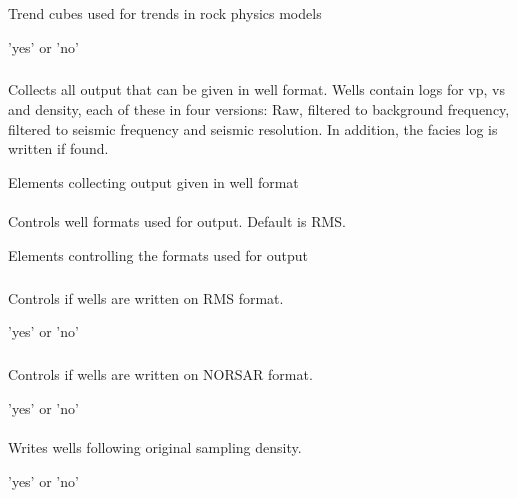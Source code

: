\subparagraph{}
 \slist
   \item \Description Trend cubes used for trends in rock physics models
   \item \Argument 'yes' or 'no'
   \item \Default
\elist

\subsubsection{}
 \slist
   \item \Description Collects all output that can be given in well format. Wells contain logs for vp, vs and density, each of these in four versions: Raw, filtered to background frequency, filtered to seismic frequency and seismic resolution. In addition, the facies log is written if found.
   \item \Argument Elements collecting output given in well format
   \item \Default
 \elist

\paragraph{}
 \slist
   \item \Description Controls well formats used for output. Default is RMS.
   \item \Argument Elements controlling the formats used for output
   \item \Default
 \elist

\subparagraph{}
 \slist
   \item \Description Controls if wells are written on RMS format.
   \item \Argument 'yes' or 'no'
   \item \Default
 \elist

 \subparagraph{}
 \slist
   \item \Description Controls if wells are written on NORSAR format.
   \item \Argument 'yes' or 'no'
   \item \Default
 \elist

\paragraph{}
 \slist
   \item \Description Writes wells following original sampling density.
   \item \Argument 'yes' or 'no'
   \item \Default
 \elist

